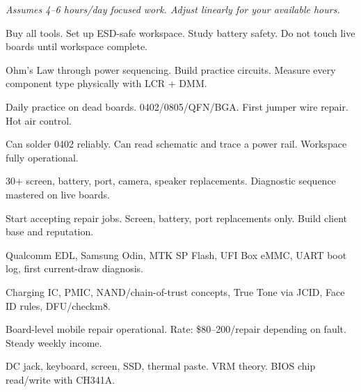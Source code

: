 

{\small\itshape\color{arligray} Assumes 4--6 hours/day focused work. Adjust linearly for your available hours.}


  {Buy all tools. Set up ESD-safe workspace. Study battery safety. Do not touch live boards until workspace complete.}

  {Ohm's Law through power sequencing. Build practice circuits. Measure every component type physically with LCR + DMM.}

  {Daily practice on dead boards. 0402/0805/QFN/BGA. First jumper wire repair. Hot air control.}

  {Can solder 0402 reliably. Can read schematic and trace a power rail. Workspace fully operational.}


  {30+ screen, battery, port, camera, speaker replacements. Diagnostic sequence mastered on live boards.}

  {Start accepting repair jobs. Screen, battery, port replacements only. Build client base and reputation.}

  {Qualcomm EDL, Samsung Odin, MTK SP Flash, UFI Box eMMC, UART boot log, first current-draw diagnosis.}

  {Charging IC, PMIC, NAND/chain-of-trust concepts, True Tone via JCID, Face ID rules, DFU/checkm8.}

  {Board-level mobile repair operational. Rate: \$80--200/repair depending on fault. Steady weekly income.}


  {DC jack, keyboard, screen, SSD, thermal paste. VRM theory. BIOS chip read/write with CH341A.}

